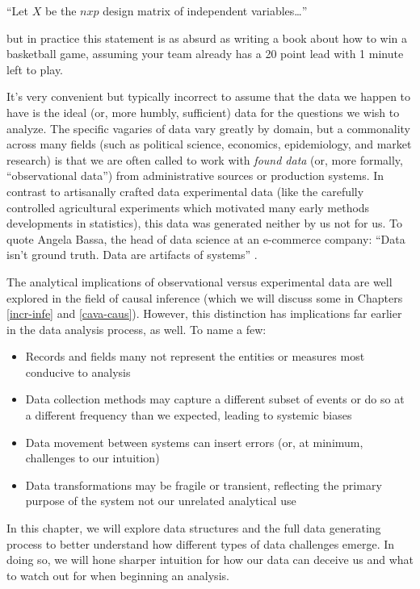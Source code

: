 \documentclass[
]{krantz}
\providecommand{\tightlist}{%
  \setlength{\itemsep}{0pt}\setlength{\parskip}{0pt}}
\renewenvironment{quote}{\begin{VF}}{\end{VF}}
\begin{document}
\begin{quote}
``Let \(X\) be the \(n x p\) design matrix of independent variables\ldots{}''
\end{quote}

but in practice this statement is as absurd as writing a book about how to win a basketball game, assuming your team already has a 20 point lead with 1 minute left to play.

It's very convenient but typically incorrect to assume that the data we happen to have is the ideal (or, more humbly, sufficient) data for the questions we wish to analyze.
The specific vagaries of data vary greatly by domain, but a commonality across many fields (such as political science, economics, epidemiology, and market research) is that we are often called to work with \emph{found data} (or, more formally, ``observational data'') from administrative sources or production systems.
In contrast to artisanally crafted data experimental data (like the carefully controlled agricultural experiments which motivated many early methods developments in statistics), this data was generated neither by us not for us.
To quote Angela Bassa, the head of data science at an e-commerce company: ``Data isn't ground truth. Data are artifacts of systems'' \citep{bassa_2017}.

The analytical implications of observational versus experimental data are well explored in the field of causal inference (which we will discuss some in Chapters \ref{incr-infe} and \ref{cava-caus}).
However, this distinction has implications far earlier in the data analysis process, as well.
To name a few:

\begin{itemize}
\tightlist
\item
  Records and fields many not represent the entities or measures most conducive to analysis
\item
  Data collection methods may capture a different subset of events or do so at a different frequency than we expected, leading to systemic biases
\item
  Data movement between systems can insert errors (or, at minimum, challenges to our intuition)
\item
  Data transformations may be fragile or transient, reflecting the primary purpose of the system not our unrelated analytical use
\end{itemize}

In this chapter, we will explore data structures and the full data generating process to better understand how different types of data challenges emerge.
In doing so, we will hone sharper intuition for how our data can deceive us and what to watch out for when beginning an analysis.
\end{document}

